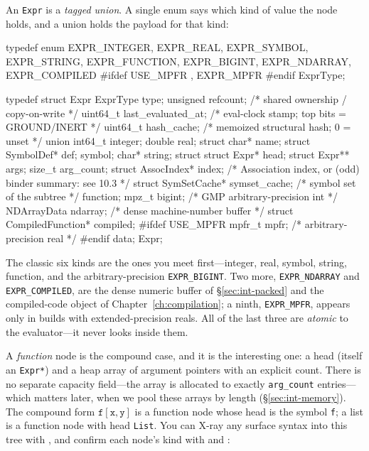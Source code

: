 An \texttt{Expr} is a \emph{tagged union}. A single enum says which kind of value the
node holds, and a union holds the payload for that kind:

\begin{ccode}
typedef enum {
    EXPR_INTEGER, EXPR_REAL, EXPR_SYMBOL, EXPR_STRING,
    EXPR_FUNCTION, EXPR_BIGINT, EXPR_NDARRAY, EXPR_COMPILED
#ifdef USE_MPFR
    , EXPR_MPFR
#endif
} ExprType;

typedef struct Expr {
    ExprType type;
    unsigned refcount;            /* shared ownership / copy-on-write         */
    uint64_t last_evaluated_at;   /* eval-clock stamp; top bits = GROUND/INERT */
    uint64_t hash_cache;          /* memoized structural hash; 0 = unset      */
    union {
        int64_t integer;
        double  real;
        struct { char* name; struct SymbolDef* def; } symbol;
        char*   string;
        struct {
            struct Expr*  head;
            struct Expr** args;
            size_t        arg_count;
            struct AssocIndex*  index;         /* Association index, or (odd)
                                                  binder summary: see 10.3   */
            struct SymSetCache* symset_cache;  /* symbol set of the subtree  */
        } function;
        mpz_t bigint;                          /* GMP arbitrary-precision int */
        NDArrayData ndarray;                   /* dense machine-number buffer */
        struct CompiledFunction* compiled;
#ifdef USE_MPFR
        mpfr_t mpfr;                           /* arbitrary-precision real    */
#endif
    } data;
} Expr;
\end{ccode}

The classic six kinds are the ones you meet first---integer, real, symbol, string,
function, and the arbitrary-precision \texttt{EXPR\_BIGINT}. Two more,
\texttt{EXPR\_NDARRAY} and \texttt{EXPR\_COMPILED}, are the dense numeric buffer of
\S\ref{sec:int-packed} and the compiled-code object of
Chapter~\ref{ch:compilation}; a ninth, \texttt{EXPR\_MPFR}, appears only in builds
with extended-precision reals. All of the last three are \emph{atomic} to the
evaluator---it never looks inside them.

A \emph{function} node is the compound case, and it is the interesting one: a head
(itself an \texttt{Expr*}) and a heap array of argument pointers with an explicit
count. There is no separate capacity field---the array is allocated to exactly
\texttt{arg\_count} entries---which matters later, when we pool these arrays by
length (\S\ref{sec:int-memory}). The compound form \(\mathtt{f[x, y]}\) is a function
node whose head is the symbol \texttt{f}; a list is a function node with head
\texttt{List}. You can X-ray any surface syntax into this tree with , and
confirm each node's kind with  and :

